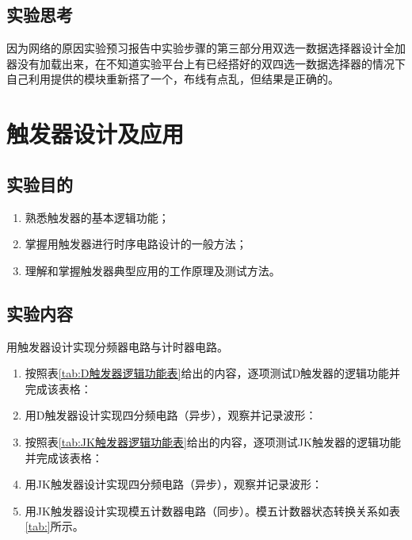 \documentclass{ctexrep}
\begin{document}
\newpage
\section{实验思考}%
\label{sec:实验思考\arabic{chapter}}

因为网络的原因实验预习报告中实验步骤的第三部分用双选一数据选择器设计全加器没有加载出来，在不知道实验平台上有已经搭好的双四选一数据选择器的情况下自己利用提供的模块重新搭了一个，布线有点乱，但结果是正确的。

\chapter{触发器设计及应用}%
\label{cha:触发器设计及应用\arabic{chapter}}

\section{实验目的}%
\label{sec:实验目的\arabic{chapter}}

\begin{enumerate}
	\item 熟悉触发器的基本逻辑功能；
	\item 掌握用触发器进行时序电路设计的一般方法；
	\item 理解和掌握触发器典型应用的工作原理及测试方法。
\end{enumerate}

\section{实验内容}%
\label{sec:实验内容\arabic{chapter}}

用触发器设计实现分频器电路与计时器电路。

\begin{enumerate}
	\item\label{it:1}按照表\ref{tab:D触发器逻辑功能表}给出的内容，逐项测试D触发器的逻辑功能并完成该表格：
	\item\label{it:2}用D触发器设计实现四分频电路（异步），观察并记录波形：
	\item\label{it:3}按照表\ref{tab:JK触发器逻辑功能表}给出的内容，逐项测试JK触发器的逻辑功能并完成该表格：
	\item\label{it:4}用JK触发器设计实现四分频电路（异步），观察并记录波形：
	\item\label{it:5}用JK触发器设计实现模五计数器电路（同步）。模五计数器状态转换关系如表\ref{tab:}所示。
\end{enumerate}
\end{document}
